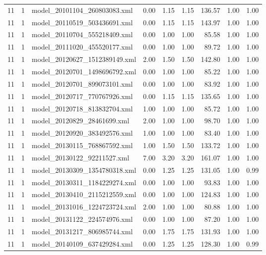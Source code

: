 \begin{table}[ht]
\begin{tabular}{rrlrrrrrr}
   11 &   1 & model\_20101104\_260803083.xml & 0.00 & 1.15 & 1.15 & 136.57 & 1.00 & 1.00 \\ 
   11 &   1 & model\_20110519\_503436691.xml & 0.00 & 1.15 & 1.15 & 143.97 & 1.00 & 1.00 \\ 
   11 &   1 & model\_20110704\_555218409.xml & 0.00 & 1.00 & 1.00 & 85.58 & 1.00 & 1.00 \\ 
   11 &   1 & model\_20111020\_455520177.xml & 0.00 & 1.00 & 1.00 & 89.72 & 1.00 & 1.00 \\ 
   11 &   1 & model\_20120627\_1512389149.xml & 2.00 & 1.50 & 1.50 & 142.80 & 1.00 & 1.00 \\ 
   11 &   1 & model\_20120701\_1498696792.xml & 0.00 & 1.00 & 1.00 & 85.22 & 1.00 & 1.00 \\ 
   11 &   1 & model\_20120701\_899073101.xml & 0.00 & 1.00 & 1.00 & 83.92 & 1.00 & 1.00 \\ 
   11 &   1 & model\_20120717\_770767926.xml & 0.00 & 1.15 & 1.15 & 135.65 & 1.00 & 1.00 \\ 
   11 &   1 & model\_20120718\_813832704.xml & 1.00 & 1.00 & 1.00 & 85.72 & 1.00 & 1.00 \\ 
   11 &   1 & model\_20120829\_28461699.xml & 2.00 & 1.00 & 1.00 & 98.70 & 1.00 & 1.00 \\ 
   11 &   1 & model\_20120920\_383492576.xml & 1.00 & 1.00 & 1.00 & 83.40 & 1.00 & 1.00 \\ 
   11 &   1 & model\_20130115\_768867592.xml & 1.00 & 1.50 & 1.50 & 133.72 & 1.00 & 1.00 \\ 
   11 &   1 & model\_20130122\_92211527.xml & 7.00 & 3.20 & 3.20 & 161.07 & 1.00 & 1.00 \\ 
   11 &   1 & model\_20130309\_1354780318.xml & 0.00 & 1.25 & 1.25 & 131.05 & 1.00 & 0.99 \\ 
   11 &   1 & model\_20130311\_1184229274.xml & 0.00 & 1.00 & 1.00 & 93.83 & 1.00 & 1.00 \\ 
   11 &   1 & model\_20130410\_2115212559.xml & 0.00 & 1.00 & 1.00 & 124.83 & 1.00 & 1.00 \\ 
   11 &   1 & model\_20131016\_1224723724.xml & 2.00 & 1.00 & 1.00 & 80.88 & 1.00 & 1.00 \\ 
   11 &   1 & model\_20131122\_224574976.xml & 0.00 & 1.00 & 1.00 & 87.20 & 1.00 & 1.00 \\ 
   11 &   1 & model\_20131217\_806985744.xml & 0.00 & 1.75 & 1.75 & 131.93 & 1.00 & 1.00 \\ 
   11 &   1 & model\_20140109\_637429284.xml & 0.00 & 1.25 & 1.25 & 128.30 & 1.00 & 0.99 \\ 

\end{tabular}
\end{table}
